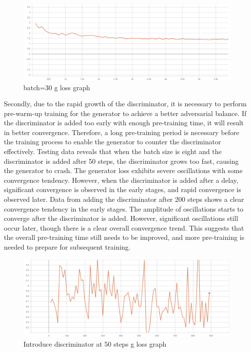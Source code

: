 \documentclass[10pt,journal,compsoc]{IEEEtran}
\begin{document}
\begin{figure}
    \centering
    \includegraphics[scale=0.6] {PNG/3-6.png}
    \caption{batch=30 g loss graph}
    \label{fig:3-6}
\end{figure}

Secondly, due to the rapid growth of the discriminator, it is necessary to perform pre-warm-up training for the generator to achieve a better adversarial balance. If the discriminator is added too early with enough pre-training time, it will result in better convergence. Therefore, a long pre-training period is necessary before the training process to enable the generator to counter the discriminator effectively. Testing data reveals that when the batch size is eight and the discriminator is added after 50 steps, the discriminator grows too fast, causing the generator to crash. The generator loss exhibits severe oscillations with some convergence tendency. However, when the discriminator is added after a delay, significant convergence is observed in the early stages, and rapid convergence is observed later. Data from adding the discriminator after 200 steps shows a clear convergence tendency in the early stages. The amplitude of oscillations starts to converge after the discriminator is added. However, significant oscillations still occur later, though there is a clear overall convergence trend. This suggests that the overall pre-training time still needs to be improved, and more pre-training is needed to prepare for subsequent training.

\begin{figure}
    \centering
    \includegraphics[scale=0.6] {PNG/3-7.png}
    \caption{Introduce discriminator at 50 steps g loss graph}
    \label{fig:3-7}
\end{figure}
\end{document}
